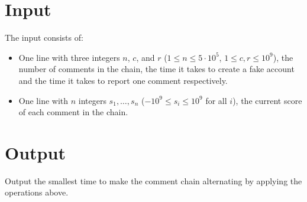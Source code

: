 \section*{Input}
The input consists of:
\begin{itemize}
  \item One line with three integers $n$, $c$, and $r$ ($1 \leq n \leq 5\cdot 10^5$, $1 \leq c,r \leq 10^9$), the number of comments in the chain,
    the time it takes to create a fake account and the time it takes to report one comment respectively.
  \item One line with $n$ integers $s_1, \ldots, s_n$ ($-10^9 \leq s_i \leq 10^9$ for all $i$), the current score of each comment in the chain.
\end{itemize}

\section*{Output}
Output the smallest time to make the comment chain alternating by applying the operations above.


